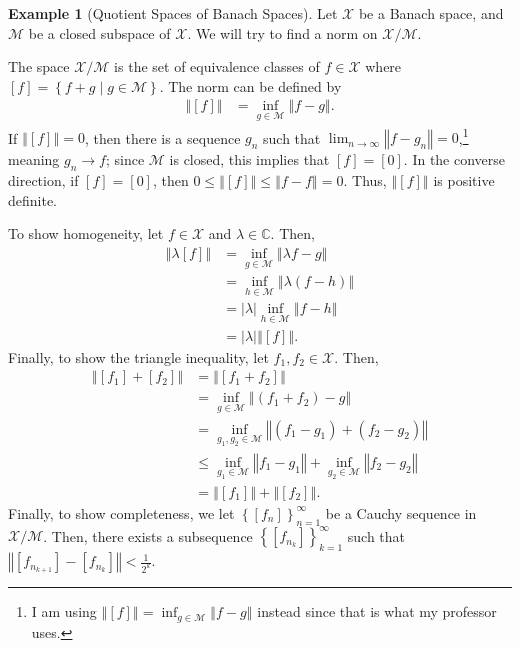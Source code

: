 \documentclass[12pt]{extarticle}
\newcommand{\C}{\mathbb{C}}
\newcommand{\norm}[1]{\left\Vert #1\right\Vert}
\newcommand{\set}[1]{\left\{#1\right\}}
\theoremstyle{plain}
\theoremstyle{definition}
\newtheorem*{example}{Example}
\theoremstyle{note}
\renewcommand{\newline}{\hfill\break}
\begin{document}
\begin{example}[Quotient Spaces of Banach Spaces]
  Let $\mathcal{X}$ be a Banach space, and $\mathcal{M}$ be a closed subspace of $\mathcal{X}$. We will try to find a norm on $\mathcal{X}/\mathcal{M}$.\newline

  The space $\mathcal{X}/\mathcal{M}$ is the set of equivalence classes of $f\in \mathcal{X}$ where $[f] = \set{f + g\mid g\in \mathcal{M}}$. The norm can be defined by
  \begin{align*}
    \norm{[f]} &= \inf_{g\in \mathcal{M}}\norm{f-g}.
  \end{align*}
  If $\norm{[f]} = 0$, then there is a sequence $g_n$ such that $\lim_{n\rightarrow\infty}\norm{f - g_n} = 0$,\footnote{I am using $\norm{[f]} = \inf_{g\in \mathcal{M}}\norm{f-g}$ instead since that is what my professor uses.} meaning $g_n \rightarrow f$; since $\mathcal{M}$ is closed, this implies that $[f] = [0]$. In the converse direction, if $[f] = [0]$, then $0\leq \norm{[f]} \leq \norm{f-f} = 0$. Thus, $\norm{[f]}$ is positive definite.\newline

  To show homogeneity, let $f\in \mathcal{X}$ and $\lambda \in \C$. Then,
  \begin{align*}
    \norm{\lambda[f]} &= \inf_{g\in \mathcal{M}}\norm{\lambda f - g}\\
                      &= \inf_{h\in \mathcal{M}}\norm{\lambda\left(f - h\right)}\\
                      &= |\lambda|\inf_{h\in \mathcal{M}}\norm{f - h}\\
                      &= |\lambda|\norm{[f]}.
  \end{align*}
  Finally, to show the triangle inequality, let $f_1,f_2\in \mathcal{X}$. Then,
  \begin{align*}
    \norm{[f_1] + [f_2]} &= \norm{[f_1 + f_2]}\\
                         &= \inf_{g\in \mathcal{M}}\norm{\left(f_1 + f_2\right) - g}\\
                         &= \inf_{g_1,g_2\in \mathcal{M}}\norm{(f_1 - g_1) + (f_2 - g_2)}\\
                         &\leq \inf_{g_1\in \mathcal{M}}\norm{f_1 - g_1} + \inf_{g_2\in \mathcal{M}}\norm{f_2 - g_2}\\
                         &= \norm{[f_1]} + \norm{[f_2]}.
  \end{align*}
  Finally, to show completeness, we let $\set{[f_n]}_{n=1}^{\infty}$ be a Cauchy sequence in $\mathcal{X}/\mathcal{M}$. Then, there exists a subsequence $\set{\left[f_{n_k}\right]}_{k=1}^{\infty}$ such that $\norm{\left[f_{n_{k+1}}\right] - \left[f_{n_k}\right]} < \frac{1}{2^k}$.\newline


\end{example}
\end{document}
